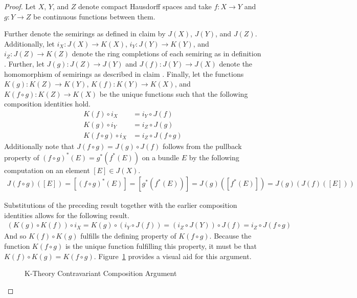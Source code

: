 \documentclass[../../sean_thesis.tex]{subfiles}
\begin{document}
\begin{proof}
	Let $X$, $Y$, and $Z$ denote compact Hausdorff spaces and take $f: X \to Y$ and $g: Y \to Z$ be continuous functions between them.
	
	Further denote the semirings as defined in claim  by $J(X)$, $J(Y)$, and $J(Z)$. Additionally, let $i_X: J(X) \to K(X)$, $i_Y: J(Y) \to K(Y)$, and $i_Z: J(Z) \to K(Z)$ denote the ring completions of each semiring as in definition . Further, let $J(g): J(Z) \to J(Y)$ and $J(f): J(Y) \to J(X)$ denote the homomorphism of semirings as described in claim .  Finally, let the functions $K(g): K(Z) \to K(Y)$, $K(f): K(Y) \to K(X)$, and $K(f \circ  g): K(Z) \to K(X)$ be the unique functions such that the following composition identities hold.
	\begin{align*}
		K(f) \circ i_X &= i_Y \circ J(f)\\
		K(g) \circ i_Y &= i_Z \circ J(g)\\
		K(f \circ g) \circ i_X &= i_Z \circ J(f \circ g)
	\end{align*}	
Additionally note that $J(f \circ g) = J(g) \circ J(f)$ follows from the pullback property of  $(f\circ g)^{*}(E) = g^{*}(f^{*}(E))$ on a bundle $E$ by the following computation on an element $[E] \in J(X)$.
	\begin{align*}
		J(f \circ g)([E]) 
		= [(f \circ g)^{*}(E)]
		= [g^{*}(f^{*}(E))] 
		= J(g)([f^{*}(E)])
		= J(g)(J(f)([E]))
	\end{align*}
	
Substitutions of the preceding result together with the earlier composition identities allows for the following result.
	\begin{align*}
		(K(g) \circ 	K(f)) \circ i_X 
		= K(g) \circ (i_Y \circ J(f)) 
		= (i_Z \circ J(Y)) \circ J(f)
		= i_Z \circ J(f \circ g)
	\end{align*}
And so $K(f) \circ K(g)$ fulfills the defining property of $K(f \circ g)$. Because the function $K(f \circ g)$ is the unique function fulfilling this property, it must be that $K(f) \circ K(g) = K(f \circ g)$. Figure~\ref{fig:ktheory_contravariant_composition} provides a visual aid for this argument.

\begin{figure}[ht!]
	
	\caption{K-Theory Contravariant Composition Argument}
	\label{fig:ktheory_contravariant_composition}
\end{figure}

\end{proof}
\end{document}
